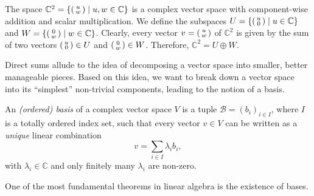 \documentclass[a4paper,oneside, 12pt]{amsart}
\begin{document}
\begin{example}\label{ex:direct-sum-c2}
  The space \( \mathbb{C}^2=\{\begin{psmallmatrix} u \\ w \end{psmallmatrix} \mid u,w \in \mathbb{C}
  \}\) is a complex vector space with component-wise addition and scalar multiplication.
  We define the subspaces
  \(U = \{\begin{psmallmatrix} u \\ 0 \end{psmallmatrix} \mid u \in \mathbb{C}\}\) and \(W = \{\begin{psmallmatrix} 0 \\ w \end{psmallmatrix} \mid w \in \mathbb{C}\}\).
  Clearly, every vector \(v =
  \begin{psmallmatrix}
    u \\ w
  \end{psmallmatrix}
  \) of \(\mathbb{C}^{2}\) is given by the sum of two vectors \(
  \begin{psmallmatrix}
    u \\0
  \end{psmallmatrix} \in U
  \) and \(
  \begin{psmallmatrix}
    0 \\ w
  \end{psmallmatrix}
  \in W
  \).
  Therefore, \( \mathbb{C}^{2}= U \oplus W\).
\end{example}

Direct sums allude to the idea of decomposing a vector space into smaller, better manageable pieces.
Based on this idea, we want to break down a vector space into its ``simplest'' non-trivial components, leading to the notion of a basis.


\begin{definition}\label{def:basis}
  An \emph{(ordered) basis} of a complex vector space \( V \) is a tuple \( \mathcal{B} = (b_i)_{i \in I} \), where \( I \) is a totally ordered index set, such that every vector \( v \in V \) can be written as a \emph{unique} linear combination
  \begin{equation*}
    v = \sum_{i \in I} \lambda_i b_i,
  \end{equation*}
  with \( \lambda_i \in \mathbb{C} \) and only finitely many \( \lambda_i \) are non-zero.
\end{definition}

One of the most fundamental theorems in linear algebra is the existence of bases.
\end{document}
